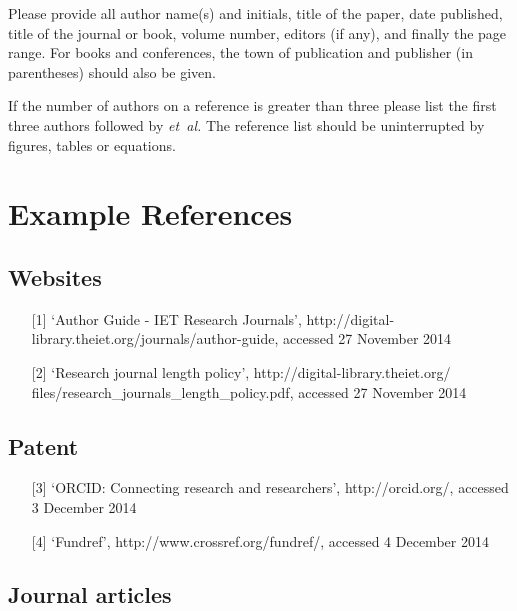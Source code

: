 \documentclass{cta-author}
\begin{document}
Please provide all author name(s) and initials, title of the paper, date
published, title of the journal or book, volume number, editors (if any),
and finally the page range. For books and conferences, the town of
publication and publisher (in parentheses) should also be given.

If the number of authors on a reference is greater than three please list
the first three authors followed by \textit{et~al.} The reference list should be uninterrupted by figures, tables or equations.


\section*{Example References}\label{sec13}

\subsection{Websites}\label{subsec13.1}

\begin{enumerate}
\item[{[1]}] `Author Guide - IET Research Journals',
http://digital-library.theiet.org/journals/author-guide, accessed 27
November 2014\vspace*{6pt}

\item[{[2]}] `Research journal length policy',
http://digital-library.theiet.org/ files/research\_journals\_length\_policy.pdf,
accessed 27 November 2014
\end{enumerate}

\subsection{Patent}\label{subsec13.2}

\begin{enumerate}
\item[{[3]}] `ORCID: Connecting research and researchers', http://orcid.org/,
accessed 3 December 2014\vspace*{6pt}

\item[{[4]}]
`Fundref', http://www.crossref.org/fundref/, accessed 4 December 2014
\end{enumerate}

\subsection{Journal articles}\label{subsec13.3}
\end{document}
